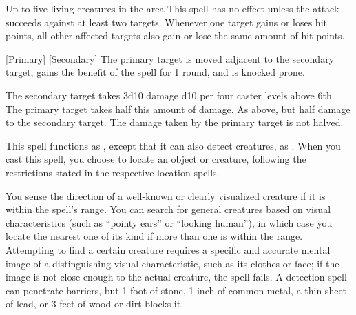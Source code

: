 \spelldur{\durshort}
\begin{spelltargets}{Up to five living creatures in the area}
    \spellspecial This spell has no effect unless the attack succeeds against at least two targets.
    \spellsuccess Whenever one target gains or loses hit points, all other affected targets also gain or lose the same amount of hit points.
\end{spelltargets}

\spellrng{\rngclose}
[Primary]
[Secondary]
\spellline
\spelleffect The primary target is moved adjacent to the secondary target, gains the benefit of the  spell for 1 round, and is knocked prone.
\begin{spellmargin}
    \spellsuccess The secondary target takes 3d10 damage \add d10 per four caster levels above 6th. The primary target takes half this amount of damage.
    \spellfailure As above, but half damage to the secondary target. The damage taken by the primary target is not halved.
\end{spellmargin}

\spellrng{\rngext}
\spelldur{\durlong \dismissable}
\spelleffect This spell functions as , except that it can also detect creatures, as . When you cast this spell, you choose to locate an object or creature, following the restrictions stated in the respective location spells.

\spellrng{\rnglong}
\spelldur{\durmed \dismissable}
\spelleffect You sense the direction of a well-known or clearly visualized creature if it is within the spell's range. You can search for general creatures based on visual characteristics (such as ``pointy ears'' or ``looking human''), in which case you locate the nearest one of its kind if more than one is within the range. Attempting to find a certain creature requires a specific and accurate mental image of a distinguishing visual characteristic, such as its clothes or face; if the image is not close enough to the actual creature, the spell fails.
\spellnotes A detection spell can penetrate barriers, but 1 foot of stone, 1 inch of common metal, a thin sheet of lead, or 3 feet of wood or dirt blocks it.


